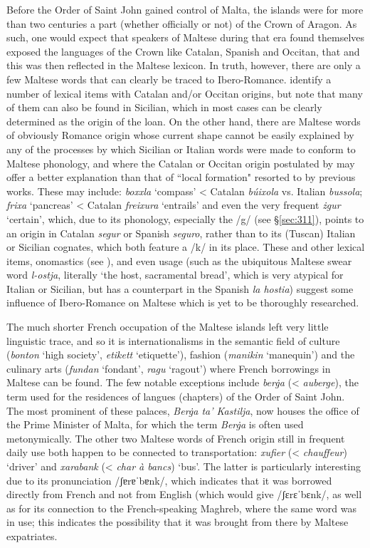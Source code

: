 \documentclass[output=paper]{langsci/langscibook}
\begin{document}
Before the Order of Saint John gained control of Malta, the islands were for more than two centuries a part (whether officially or not) of the Crown of Aragon. As such, one would expect that speakers of Maltese during that era found themselves exposed the languages of the Crown like Catalan, Spanish and Occitan, that and this was then reflected in the Maltese lexicon. In truth, however, there are only a few Maltese words that can clearly be traced to Ibero-Romance. \cite{catalan2017} identify a number of lexical items with Catalan and/or Occitan origins, but note that many of them can also be found in Sicilian, which in most cases can be clearly determined as the origin of the loan. On the other hand, there are Maltese words of obviously Romance origin whose current shape cannot be easily explained by any of the processes by which Sicilian or Italian words were made to conform to Maltese phonology, and where the Catalan or Occitan origin postulated by \cite{catalan2017} may offer a better explanation than that of ``local formation" resorted to by previous works. These may include: \textit{boxxla} `compass' < Catalan \textit{búixola} vs. Italian \textit{bussola}; \textit{frixa} `pancreas' < Catalan \textit{freixura} `entrails' and even the very frequent \textit{żgur} `certain', which, due to its phonology, especially the /g/ (see §\ref{sec:311}), points to an origin in Catalan \textit{segur} or Spanish \textit{seguro}, rather than to its (Tuscan) Italian or Sicilian cognates, which both feature a /k/ in its place. These and other lexical items, onomastics (see \citealt[46]{catalan2017}), and even usage (such as the ubiquitous Maltese swear word \textit{l-ostja}, literally `the host, sacramental bread', which is very atypical for Italian or Sicilian, but has a counterpart in the Spanish \textit{la hostia}) suggest some influence of Ibero-Romance on Maltese which is yet to be thoroughly researched.

The much shorter French occupation of the Maltese islands left very little linguistic trace, and so it is internationalisms in the semantic field of culture (\textit{bonton} `high society', \textit{etikett} `etiquette'), fashion (\textit{manikin} `manequin') and the culinary arts (\textit{fundan} `fondant', \textit{ragu} `ragout') where French borrowings in Maltese can be found. The few notable exceptions include \textit{berġa} (< \textit{auberge}), the term used for the residences of langues (chapters) of the Order of Saint John. The most prominent of these palaces, \textit{Berġa ta' Kastilja}, now houses the office of the Prime Minister of Malta, for which the term \textit{Berġa} is often used metonymically. The other two Maltese words of French origin still in frequent daily use both happen to be connected to transportation: \textit{xufier} (< \textit{chauffeur}) `driver' and \textit{xarabank} (< \textit{char à bancs}) `bus'. The latter is particularly interesting due to its pronunciation /ʃɐrɐˈbɐnk/, which indicates that it was borrowed directly from French and not from English (which would give /ʃɛrɛˈbɛnk/, as well as for its connection to the French-speaking Maghreb, where the same word was in use; this indicates the possibility that it was brought from there by Maltese expatriates.
\end{document}
